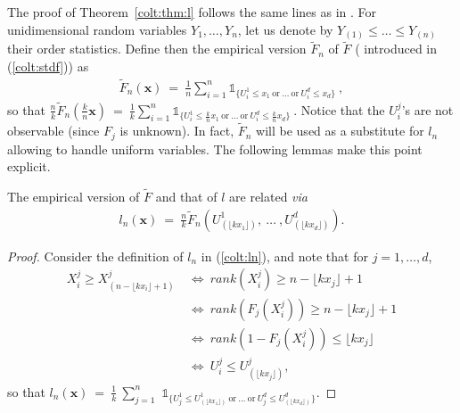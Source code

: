 The proof of Theorem~\ref{colt:thm:l} follows the same lines as in \cite{Qi97}.
For  unidimensional random variables $Y_1,\ldots,Y_n$, let us denote
by $Y_{(1)} \le \ldots\le Y_{(n)}$ their order statistics. Define 
then the empirical version $\tilde F_n$ of $\tilde F$ ( introduced in
(\ref{colt:stdf})) as 
\begin{align*}
 \tilde F_n(\mathbf{x})  ~=~ \frac{1}{n} \sum_{i=1}^n \mathds{1}_{\{ U_i^1 \le x_1 ~\text{or}~\ldots~\text{or}~ U_i^d \le x_d \}}~ ,%
\end{align*}
so that 
$%
  \frac{n}{k} \tilde F_n(\frac{k}{n}\mathbf{x}) ~=~ \frac{1}{k}
  \sum_{i=1}^n \mathds{1}_{\{ U_i^1 \le \frac{k}{n}x_1 ~\text{or}~\ldots~\text{or}~
    U_i^d \le \frac{k}{n}x_d
    \}}~
$. %
\noindent Notice that the $U_i^j$'s are  not observable (since $F_j$ is
unknown). In fact, $\tilde F_n$ will be used as a substitute for $l_n$
 allowing to handle uniform variables. The 
 following lemmas make this point explicit. %

\begin{lemma}
\label{colt:ln-Fn}
The  empirical version of $\tilde F$ and that of $l$ are related \emph{via}
\begin{align*}
l_n(\mathbf{x})~=~\frac{n}{k} \tilde F_n(U_{(\lfloor kx_1\rfloor)}^1,~\ldots~, U_{(\lfloor kx_d \rfloor)}^d).
\end{align*}
\end{lemma}

\begin{proof}
Consider the definition of $l_n$ in (\ref{colt:ln}), and note that for $j=1,\ldots,d$, 
\begin{align*}
 X_i^j \ge X_{(n-\lfloor  kx_i \rfloor +1)}^j &~\Leftrightarrow~ rank(X_i^j) \ge n-\lfloor  kx_j \rfloor+1 \\ &~\Leftrightarrow~  rank( F_j(X_i^j)) \ge n-\lfloor kx_j\rfloor+1 \\ &~\Leftrightarrow~  rank(1-F_j(X_i^j)) \le \lfloor kx_j\rfloor\\ &~\Leftrightarrow~  U_i^j \le U_{(\lfloor kx_j\rfloor)}^j,
\end{align*}
 so that 
$l_n(\mathbf{x})~=~\frac{1}{k}~\sum_{j=1}^n$ $\mathds{1}_{\{ U_j^1 \le U_{(\lfloor kx_1\rfloor)}^1 ~\text{or}~\ldots~\text{or}~ U_j^d \le U_{(\lfloor kx_d\rfloor)}^d  \}}$.
\end{proof}
~\\

